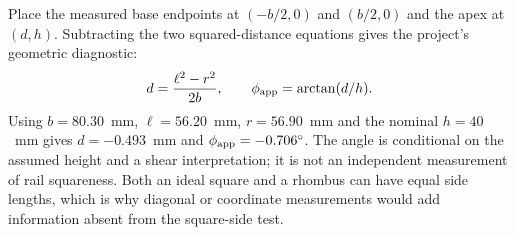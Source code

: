 Place the measured base endpoints at $(-b/2,0)$ and $(b/2,0)$ and the apex at $(d,h)$. Subtracting the two squared-distance equations gives the project's geometric diagnostic:
\begin{equation}
d=\frac{\ell^2-r^2}{2b},\qquad \phi_{\rm app}=\arctan(d/h).
\label{eq:res-apex}
\end{equation}
Using $b=80.30$~mm, $\ell=56.20$~mm, $r=56.90$~mm and the nominal $h=40$~mm gives $d=-0.493$~mm and $\phi_{\rm app}=-0.706^\circ$. The angle is conditional on the assumed height and a shear interpretation; it is not an independent measurement of rail squareness. Both an ideal square and a rhombus can have equal side lengths, which is why diagonal or coordinate measurements would add information absent from the square-side test.

